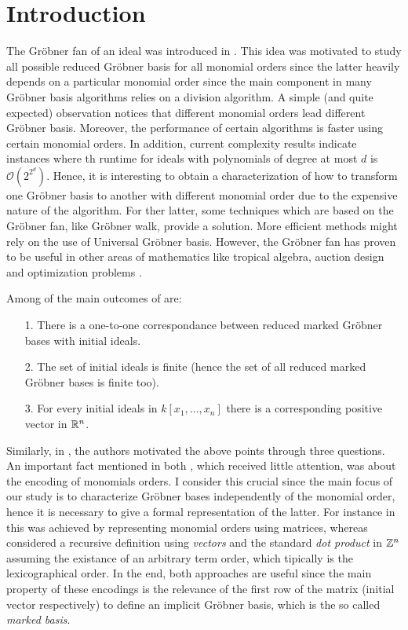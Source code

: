 \section{Introduction}

The Gr\"obner fan of an ideal was introduced in \cite{MORA1988183}.
This idea was motivated to study all possible reduced Gr\"obner
basis for all monomial orders since the latter heavily depends
on a particular monomial order \cite{Cox:2015:IVA:2821082}
since the main component in many Gr\"obner basis algorithms
relies on a division algorithm. A simple (and quite expected)
observation notices that different monomial orders lead
different Gr\"obner basis. Moreover, the performance of certain
algorithms is faster using certain monomial orders. In addition,
current complexity results \cite{MAYR1982305} indicate instances
where th runtime for ideals with polynomials of
degree at most $d$ is $\mathcal{O}(2^{2^d})$. Hence, it is interesting to
obtain a characterization of how to transform one Gr\"obner
basis to another with different monomial order due to the expensive
nature of the algorithm. For ther latter,
some techniques which are based on the Gr\"obner fan, like Gr\"obner walk,
provide a solution. More efficient methods might rely on the use of
Universal Gr\"obner basis. However, the Gr\"obner fan has proven to
be useful in other areas of mathematics like tropical algebra, auction
design and optimization problems \cite{2014arXiv1408.0313K}.

Among of the main outcomes of \cite{MORA1988183} are:

\begin{itemize}
\item[1.] There is a one-to-one correspondance between reduced
  marked Gr\"obner bases with initial ideals.
\item[2.] The set of initial ideals is finite (hence the set of all
  reduced marked Gr\"obner bases is finite too).
\item[3.] For every initial ideals in $k[x_1, \dots, x_n]$
  there is a corresponding positive vector in $\mathbb{R}^n$.  
\end{itemize}

Similarly, in \cite{Cox:2014}, the authors motivated the above points
through three questions. An important fact mentioned
in both \cite{Cox:2014, SturmfelsGrobConv}, which received little attention,
was about the encoding of monomials orders. I consider this crucial since the
main focus of our study is to characterize Gr\"obner bases independently
of the monomial order, hence it is necessary to give a formal representation
of the latter. For instance in \cite{Cox:2014} this was achieved by
representing monomial orders using matrices, whereas \cite{SturmfelsGrobConv}
considered a recursive definition using \emph{vectors} and the standard \emph{dot product}
in $\mathbb{Z}^n$ assuming the existance of an arbitrary term order, which tipically
is the lexicographical order. In the end, both approaches are useful
since the main property of these encodings is the relevance of the first
row of the matrix (initial vector respectively) to define an implicit
Gr\"obner basis, which is the so called \emph{marked \grob basis}.

